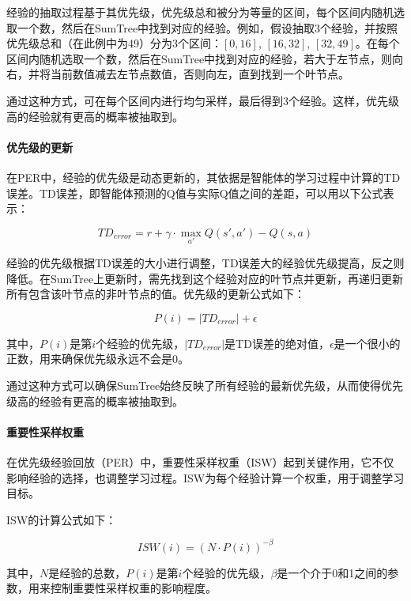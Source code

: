 经验的抽取过程基于其优先级，优先级总和被分为等量的区间，每个区间内随机选取一个数，然后在SumTree中找到对应的经验。例如，假设抽取3个经验，并按照优先级总和（在此例中为49）分为3个区间：$[0, 16]$, $[16, 32]$, $[32, 49]$。在每个区间内随机选取一个数，然后在SumTree中找到对应的经验，若大于左节点，则向右，并将当前数值减去左节点数值，否则向左，直到找到一个叶节点。

通过这种方式，可在每个区间内进行均匀采样，最后得到3个经验。这样，优先级高的经验就有更高的概率被抽取到。

\paragraph{优先级的更新}
在PER中，经验的优先级是动态更新的，其依据是智能体的学习过程中计算的TD误差。TD误差，即智能体预测的Q值与实际Q值之间的差距，可以用以下公式表示：

\begin{equation}
    TD_{error} = r + \gamma \cdot \max_{a'}Q(s', a') - Q(s, a)
\end{equation}

经验的优先级根据TD误差的大小进行调整，TD误差大的经验优先级提高，反之则降低。在SumTree上更新时，需先找到这个经验对应的叶节点并更新，再递归更新所有包含该叶节点的非叶节点的值。优先级的更新公式如下：

\begin{equation}
    P(i) = |TD_{error}| + \epsilon
\end{equation}

其中，$P(i)$是第$i$个经验的优先级，$|TD_{error}|$是TD误差的绝对值，$\epsilon$是一个很小的正数，用来确保优先级永远不会是0。

通过这种方式可以确保SumTree始终反映了所有经验的最新优先级，从而使得优先级高的经验有更高的概率被抽取到。

\paragraph{重要性采样权重}
在优先级经验回放（PER）中，重要性采样权重（ISW）起到关键作用，它不仅影响经验的选择，也调整学习过程。ISW为每个经验计算一个权重，用于调整学习目标。

ISW的计算公式如下：

\begin{equation}
    ISW(i) = \left( N \cdot P(i) \right)^{-\beta}
\end{equation}

其中，$N$是经验的总数，$P(i)$是第$i$个经验的优先级，$\beta$是一个介于0和1之间的参数，用来控制重要性采样权重的影响程度。

